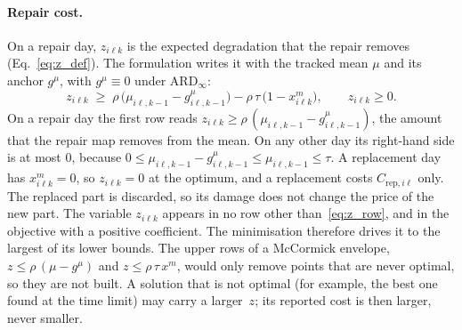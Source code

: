 \documentclass[11pt,a4paper]{article}
\theoremstyle{plain}
\theoremstyle{definition}
\theoremstyle{remark}
\begin{document}
\paragraph{Repair cost.}
On a repair day, $z_{i\ell k}$ is the expected degradation that the repair removes (Eq.~\eqref{eq:z_def}).
The formulation writes it with the tracked mean $\mu$ and its anchor $g^{\mu}$, with $g^{\mu} \equiv 0$ under $\text{ARD}_\infty$:
\begin{equation}\label{eq:z_row}
  z_{i\ell k} \;\ge\; \rho\,\bigl(\mu_{i\ell,k-1} - g^{\mu}_{i\ell,k-1}\bigr) - \rho\,\tau\,\bigl(1 - x^m_{i\ell k}\bigr),
  \qquad z_{i\ell k} \ge 0 .
\end{equation}
On a repair day the first row reads $z_{i\ell k} \ge \rho\,(\mu_{i\ell,k-1} - g^{\mu}_{i\ell,k-1})$, the amount that the repair map removes from the mean.
On any other day its right-hand side is at most $0$, because $0 \le \mu_{i\ell,k-1} - g^{\mu}_{i\ell,k-1} \le \mu_{i\ell,k-1} \le \tau$.
A replacement day has $x^m_{i\ell k} = 0$, so $z_{i\ell k} = 0$ at the optimum, and a replacement costs $C_{\mathrm{rep},i\ell}$ only.
The replaced part is discarded, so its damage does not change the price of the new part.
The variable $z_{i\ell k}$ appears in no row other than~\eqref{eq:z_row}, and in the objective with a positive coefficient.
The minimisation therefore drives it to the largest of its lower bounds.
The upper rows of a McCormick envelope, $z \le \rho\,(\mu - g^{\mu})$ and $z \le \rho\,\tau\,x^m$, would only remove points that are never optimal, so they are not built.
A solution that is not optimal (for example, the best one found at the time limit) may carry a larger~$z$; its reported cost is then larger, never smaller.
\end{document}
